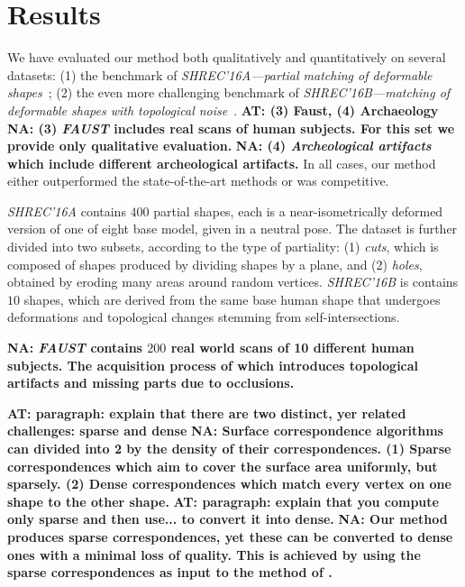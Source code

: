 \documentclass[10pt,twocolumn,letterpaper]{article}
\newcommand{\colornote}[3]{{\color{#1}\bf{#2: #3}\normalfont}}
\newcommand{\colornote}[3]{}
\newcommand {\ayellet}[1]{\colornote{blue}{AT}{#1}}
\newcommand {\nadav}[1]{\colornote{red}{NA}{#1}}
\begin{document}
\section{Results}
\label{section:results}

We have evaluated our method both qualitatively and quantitatively on several datasets:
(1) the benchmark of {\em SHREC'16A---partial matching of deformable shapes}~\cite{cosmo2016shrec};
(2) the even more challenging benchmark of {\em SHREC’16B---matching of deformable shapes with topological noise}~\cite{lahner2016shrec}.
\ayellet{(3) Faust, (4) Archaeology}
\nadav{(3) {\em FAUST}\cite{bogo2014faust} includes real scans of human subjects. For this set we provide only qualitative evaluation.}
\nadav{(4) {\em Archeological artifacts}\cite{bogo2014faust} which include different archeological artifacts.}
In all cases, our method either outperformed the state-of-the-art methods or was competitive.

{\em SHREC'16A} contains $400$ partial shapes, each is a near-isometrically deformed version of one of eight base model, given in a neutral pose.
The dataset is further divided into two subsets, according to the type of partiality:
(1) \textit{cuts}, which is composed of shapes produced by dividing shapes by a plane, and (2) \textit{holes}, obtained by eroding many areas around random vertices. 
{\em SHREC’16B} is contains $10$ shapes, which are
derived from the same base human shape that undergoes deformations and topological changes stemming from self-intersections. 

\nadav{{\em FAUST} contains $200$ real world scans of 10 different human subjects. The acquisition process of which introduces topological artifacts and missing parts due to occlusions.}

\ayellet{paragraph: explain that there are two distinct, yer related challenges: sparse and dense}
\nadav{Surface correspondence algorithms can divided into 2 by the density of their correspondences. 
	(1) Sparse correspondences which aim to cover the surface area uniformly, but sparsely.
	(2) Dense correspondences which match every vertex on one shape to the other shape.}
\ayellet{paragraph: explain that you compute only sparse and then use... to convert it into dense.}
 \nadav{ Our method produces sparse correspondences, yet these can be converted to dense ones with a minimal loss of quality.
 This is achieved by using the sparse correspondences as input to the method of \cite{litany2017fully}.}
\end{document}
